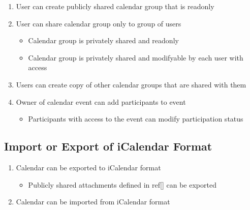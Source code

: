 \begin{enumerate}[label=\color{reqcolor}\textbf{R{\arabic*}}, resume]
    \item \label{app:req:sharing1} User can create publicly shared calendar group that is readonly
    \item \label{app:req:sharing2} User can share calendar group only to group of users    
        \begin{itemize}
            \item Calendar group is privately shared and readonly
            \item Calendar group is privately shared and modifyable by each user with access
        \end{itemize}
    \item \label{app:req:sharing3} Users can create copy of other calendar groups that are shared with them
    \item \label{app:req:sharing4} Owner of calendar event can add participants to event
        \begin{itemize}
            \item Participants with access to the event can modify participation status
        \end{itemize}
\end{enumerate}

\subsection*{Import or Export of iCalendar Format}

\begin{enumerate}[label=\color{reqcolor}\textbf{R{\arabic*}}, resume]
    \item \label{app:req:ical1} Calendar can be exported to iCalendar format
        \begin{itemize}
            \item Publicly shared attachments defined in ref[] can be exported
        \end{itemize}
    \item \label{app:req:ical2} Calendar can be imported from iCalendar format
\end{enumerate}
